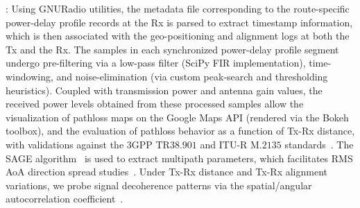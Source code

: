 \documentclass[10pt, twocolumn]{IEEEtran}
\begin{document}
: Using GNURadio utilities, the metadata file corresponding to the route-specific power-delay profile records at the Rx is parsed to extract timestamp information, which is then associated with the geo-positioning and alignment logs at both the Tx and the Rx. The samples in each synchronized power-delay profile segment undergo pre-filtering via a low-pass filter (SciPy FIR implementation), time-windowing, and noise-elimination (via custom peak-search and thresholding heuristics). Coupled with transmission power and antenna gain values, the received power levels obtained from these processed samples allow the visualization of pathloss maps on the Google Maps API (rendered via the Bokeh toolbox), and the evaluation of pathloss behavior as a function of Tx-Rx distance, with validations against the $3$GPP TR$38.901$ and ITU-R M$.2135$ standards~\cite{MacCartneyModelsOverview}. The SAGE algorithm~\cite{SAGE} is used to extract multipath parameters, which facilitates RMS AoA direction spread studies~\cite{Indoor60G}. Under Tx-Rx distance and Tx-Rx alignment variations, we probe signal decoherence patterns via the spatial/angular autocorrelation coefficient~\cite{MacCartneySpatialStatistics}.
\end{document}
